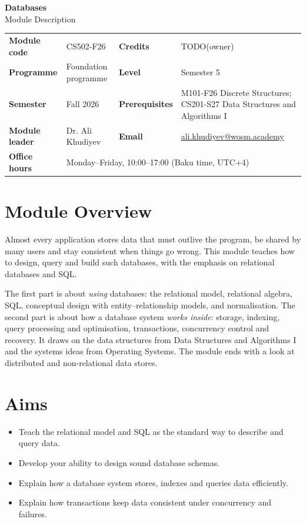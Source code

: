 \documentclass[11pt,a4paper]{article}
\makeatletter
\newcommand{\ModuleTitle}{Databases}
\newcommand{\ModuleCode}{CS502-F26}
\newcommand{\Programme}{Foundation programme}
\newcommand{\Level}{Semester 5}
\newcommand{\Semester}{Fall 2026}
\newcommand{\Credits}{TODO(owner)}
\newcommand{\ModuleLeader}{Dr. Ali Khudiyev}
\newcommand{\Email}{ali.khudiyev@wosm.academy}
\newcommand{\OfficeHours}{Monday--Friday, 10:00--17:00 (Baku time, UTC+4)}
\newcommand{\Prerequisites}{M101-F26 Discrete Structures; CS201-S27 Data Structures and Algorithms I}
\makeatother
\begin{document}
\begin{center}
  {\LARGE\bfseries\color{accent} \ModuleTitle}\\[4pt]
  {\large Module Description}
\end{center}
\vspace{6pt}

\begin{tabularx}{\textwidth}{>{\bfseries}l X >{\bfseries}l X}
\toprule
Module code   & \ModuleCode    & Credits      & \Credits \\
Programme     & \Programme     & Level        & \Level \\
Semester      & \Semester      & Prerequisites & \Prerequisites \\
Module leader & \ModuleLeader  & Email        & \href{mailto:\Email}{\Email} \\
Office hours  & \multicolumn{3}{l}{\OfficeHours} \\
\bottomrule
\end{tabularx}

\section{Module Overview}
Almost every application stores data that must outlive the program, be shared by
many users and stay consistent when things go wrong. This module teaches how to
design, query and build such databases, with the emphasis on relational databases
and SQL.

The first part is about \emph{using} databases: the relational model, relational
algebra, SQL, conceptual design with entity--relationship models, and normalisation.
The second part is about how a database system \emph{works inside}: storage,
indexing, query processing and optimisation, transactions, concurrency control and
recovery. It draws on the data structures from Data Structures and Algorithms I and
the systems ideas from Operating Systems. The module ends with a look at distributed
and non-relational data stores.

\section{Aims}
\begin{itemize}
  \item Teach the relational model and SQL as the standard way to describe and query data.
  \item Develop your ability to design sound database schemas.
  \item Explain how a database system stores, indexes and queries data efficiently.
  \item Explain how transactions keep data consistent under concurrency and failures.
\end{itemize}
\end{document}
